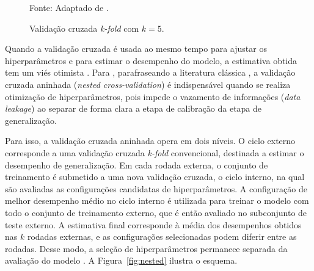 \documentclass{uflamon}          %
\begin{document}
\begin{figure}[htb]
    \centering
    \caption{Validação cruzada \textit{k-fold} com $k = 5$.}
    \label{fig:kfold}
    \par\vspace{2mm}
    {\small Fonte: Adaptado de .}
\end{figure}

Quando a validação cruzada é usada ao mesmo tempo para ajustar os hiperparâmetros e para estimar o desempenho do modelo, a estimativa obtida tem um viés otimista \cite{berrar2024}. Para , parafraseando a literatura clássica \cite{stone1974, varma2006}, a validação cruzada aninhada (\textit{nested cross-validation}) é indispensável quando se realiza otimização de hiperparâmetros, pois impede o vazamento de informações (\textit{data leakage}) ao separar de forma clara a etapa de calibração da etapa de generalização.

Para isso, a validação cruzada aninhada opera em dois níveis. O ciclo externo corresponde a uma validação cruzada \textit{k-fold} convencional, destinada a estimar o desempenho de generalização. Em cada rodada externa, o conjunto de treinamento é submetido a uma nova validação cruzada, o ciclo interno, na qual são avaliadas as configurações candidatas de hiperparâmetros. A configuração de melhor desempenho médio no ciclo interno é utilizada para treinar o modelo com todo o conjunto de treinamento externo, que é então avaliado no subconjunto de teste externo. A estimativa final corresponde à média dos desempenhos obtidos nas $k$ rodadas externas, e as configurações selecionadas podem diferir entre as rodadas. Desse modo, a seleção de hiperparâmetros permanece separada da avaliação do modelo \cite{berrar2024}. A Figura~\ref{fig:nested} ilustra o esquema.
\end{document}
